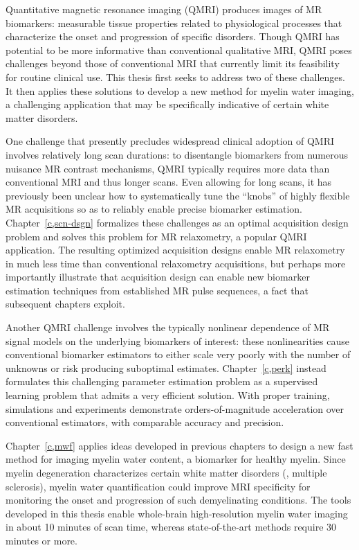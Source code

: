 \setlength{\parindent}{0ex}
Quantitative magnetic resonance imaging (QMRI)
produces images of MR biomarkers: 
measurable tissue properties
related to physiological processes
that characterize the onset and progression
of specific disorders.
Though QMRI has potential 
to be more informative 
than conventional qualitative MRI,
QMRI poses challenges 
beyond those of conventional MRI
that currently limit its feasibility 
for routine clinical use.
This thesis first seeks to address 
two of these challenges.
It then applies these solutions
to develop a new method
for myelin water imaging,
a challenging application 
that may be specifically indicative
of certain white matter disorders. 

\setlength{\parindent}{4ex}
One challenge 
that presently precludes widespread clinical adoption of QMRI
involves relatively long scan durations:
to disentangle biomarkers
from numerous nuisance MR contrast mechanisms,
QMRI typically requires more data than conventional MRI
and thus longer scans. 
Even allowing for long scans,
it has previously been unclear 
how to systematically tune the ``knobs'' 
of highly flexible MR acquisitions
so as to reliably enable precise biomarker estimation.
Chapter~\ref{c,scn-dsgn} formalizes these challenges
as an optimal acquisition design problem
and solves this problem for MR relaxometry,
a popular QMRI application.
The resulting optimized acquisition designs
enable MR relaxometry
in much less time 
than conventional relaxometry acquisitions, 
but perhaps more importantly illustrate
that acquisition design can enable 
new biomarker estimation techniques
from established MR pulse sequences,
a fact that subsequent chapters exploit.

Another QMRI challenge
involves the typically nonlinear dependence 
of MR signal models
on the underlying biomarkers of interest:
these nonlinearities 
cause conventional biomarker estimators
to either scale very poorly 
with the number of unknowns
or risk producing suboptimal estimates.
Chapter~\ref{c,perk} instead formulates
this challenging parameter estimation problem
as a supervised learning problem
that admits a very efficient solution.
With proper training,
simulations and experiments 
demonstrate orders-of-magnitude acceleration
over conventional estimators,
with comparable accuracy and precision.

Chapter~\ref{c,mwf} applies ideas 
developed in previous chapters
to design a new fast method
for imaging myelin water content,
a biomarker for healthy myelin.
Since myelin degeneration characterizes
certain white matter disorders
(\eg, multiple sclerosis),
myelin water quantification
could improve MRI specificity
for monitoring the onset and progression
of such demyelinating conditions.
The tools developed in this thesis enable 
whole-brain high-resolution myelin water imaging 
in about 10 minutes of scan time,
whereas state-of-the-art methods
require 30 minutes or more.
